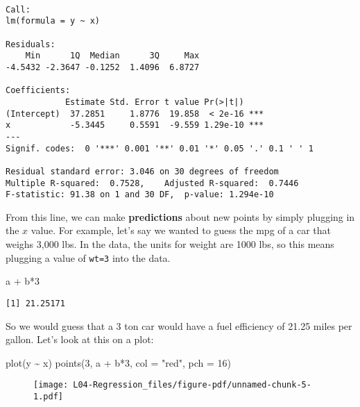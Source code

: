 \documentclass[
  letterpaper,
  DIV=11,
  numbers=noendperiod]{scrreprt}
\newenvironment{Shaded}{\begin{snugshade}}{\end{snugshade}}
\newcommand{\AttributeTok}[1]{\textcolor[rgb]{0.40,0.45,0.13}{#1}}
\newcommand{\DecValTok}[1]{\textcolor[rgb]{0.68,0.00,0.00}{#1}}
\newcommand{\FunctionTok}[1]{\textcolor[rgb]{0.28,0.35,0.67}{#1}}
\newcommand{\NormalTok}[1]{\textcolor[rgb]{0.00,0.23,0.31}{#1}}
\newcommand{\SpecialCharTok}[1]{\textcolor[rgb]{0.37,0.37,0.37}{#1}}
\newcommand{\StringTok}[1]{\textcolor[rgb]{0.13,0.47,0.30}{#1}}
\begin{document}
\begin{verbatim}

Call:
lm(formula = y ~ x)

Residuals:
    Min      1Q  Median      3Q     Max 
-4.5432 -2.3647 -0.1252  1.4096  6.8727 

Coefficients:
            Estimate Std. Error t value Pr(>|t|)    
(Intercept)  37.2851     1.8776  19.858  < 2e-16 ***
x            -5.3445     0.5591  -9.559 1.29e-10 ***
---
Signif. codes:  0 '***' 0.001 '**' 0.01 '*' 0.05 '.' 0.1 ' ' 1

Residual standard error: 3.046 on 30 degrees of freedom
Multiple R-squared:  0.7528,    Adjusted R-squared:  0.7446 
F-statistic: 91.38 on 1 and 30 DF,  p-value: 1.294e-10
\end{verbatim}

From this line, we can make \textbf{predictions} about new points by
simply plugging in the \(x\) value. For example, let's say we wanted to
guess the mpg of a car that weighs 3,000 lbs. In the data, the units for
weight are 1000 lbs, so this means plugging a value of \texttt{wt=3}
into the data.

\begin{Shaded}
\begin{Highlighting}[]
\NormalTok{a }\SpecialCharTok{+}\NormalTok{ b}\SpecialCharTok{*}\DecValTok{3}
\end{Highlighting}
\end{Shaded}

\begin{verbatim}
[1] 21.25171
\end{verbatim}

So we would guess that a 3 ton car would have a fuel efficiency of 21.25
miles per gallon. Let's look at this on a plot:

\begin{Shaded}
\begin{Highlighting}[]
\FunctionTok{plot}\NormalTok{(y }\SpecialCharTok{\textasciitilde{}}\NormalTok{ x)}
\FunctionTok{points}\NormalTok{(}\DecValTok{3}\NormalTok{, a }\SpecialCharTok{+}\NormalTok{ b}\SpecialCharTok{*}\DecValTok{3}\NormalTok{, }\AttributeTok{col =} \StringTok{"red"}\NormalTok{, }\AttributeTok{pch =} \DecValTok{16}\NormalTok{)}
\end{Highlighting}
\end{Shaded}

\begin{figure}[H]

{\centering \texttt{[image: L04-Regression\_files/figure-pdf/unnamed-chunk-5-1.pdf]}

}

\end{figure}
\end{document}
